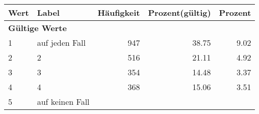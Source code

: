      \begin{longtable}{lXrrr}
     \toprule
     \textbf{Wert} & \textbf{Label} & \textbf{Häufigkeit} & \textbf{Prozent(gültig)} & \textbf{Prozent} \\
     \endhead
     \midrule
     \multicolumn{5}{l}{\textbf{Gültige Werte}}\\

     1 &
     \multicolumn{1}{X}{ auf jeden Fall   } &


       \num{947} &
       \num[round-mode=places,round-precision=2]{38.75} &
         \num[round-mode=places,round-precision=2]{9.02} \\

     2 &
     \multicolumn{1}{X}{ 2   } &


       \num{516} &
       \num[round-mode=places,round-precision=2]{21.11} &
         \num[round-mode=places,round-precision=2]{4.92} \\

     3 &
     \multicolumn{1}{X}{ 3   } &


       \num{354} &
       \num[round-mode=places,round-precision=2]{14.48} &
         \num[round-mode=places,round-precision=2]{3.37} \\

     4 &
     \multicolumn{1}{X}{ 4   } &


       \num{368} &
       \num[round-mode=places,round-precision=2]{15.06} &
         \num[round-mode=places,round-precision=2]{3.51} \\

     5 &
     \multicolumn{1}{X}{ auf keinen Fall   } &



\end{longtable}
